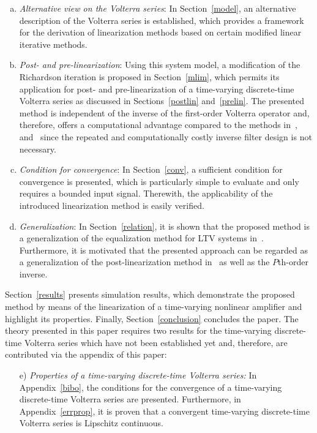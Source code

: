 \documentclass[10pt,twocolumn,twoside]{IEEEtran}
\begin{document}
\begin{enumerate}[a)]
	\item \emph{Alternative view on the Volterra series}: In Section~\ref{model}, an
		alternative description of the Volterra series
		is established, which provides a framework for the derivation of linearization
		methods based on certain modified linear iterative methods.
	\item \emph{Post- and pre-linearization}: Using this system model,
		a modification of the Richardson iteration is proposed in Section~\ref{mlim}, which permits its
		application for post- and pre-linearization of a time-varying
		discrete-time Volterra series as discussed in Sections~\ref{postlin} and~\ref{prelin}.
		The presented method is independent of the inverse of the first-order Volterra operator
		and, therefore, offers a computational advantage compared to the methods
		in~\cite{schetzen1976,sarti1992}, and~\cite{nowak1997} since the repeated and
		computationally costly inverse filter design is not necessary.
	\item \emph{Condition for convergence}: In Section~\ref{conv}, a sufficient condition
		for convergence is presented, which is particularly simple to evaluate and only requires
		a bounded input signal. Therewith, the applicability of the introduced linearization
		method is easily verified.
	\item \emph{Generalization}: In Section~\ref{relation}, it is shown that the
		proposed method is a generalization of the equalization
		method for LTV systems in~\cite{soudan2012}.
		Furthermore, it is motivated that the presented approach can be regarded as a generalization
		of the post-linearization method in~\cite{nowak1997} as well as the $P$th-order inverse.
\end{enumerate}
Section~\ref{results} presents simulation results, which demonstrate the
proposed method by means of the linearization of a time-varying nonlinear amplifier
and highlight its properties.
Finally, Section~\ref{conclusion} concludes the paper. The theory presented in this
paper requires two results for the time-varying discrete-time Volterra series which
have not been established yet and, therefore, are contributed via the appendix of
this paper:
\begin{enumerate}
	\item[e)] \emph{Properties of a time-varying discrete-time Volterra series:}
		In Appendix~\ref{bibo}, the conditions for the convergence
		of a time-varying discrete-time Volterra series are presented.
		Furthermore, in Appendix~\ref{errprop}, it is proven that a convergent time-varying discrete-time
		Volterra series is Lipschitz continuous.
\end{enumerate}
\end{document}
